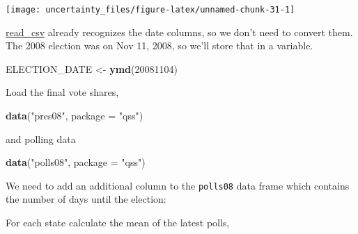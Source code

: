 \documentclass[]{book}
\newenvironment{Shaded}{\begin{snugshade}}{\end{snugshade}}
\newcommand{\KeywordTok}[1]{\textcolor[rgb]{0.13,0.29,0.53}{\textbf{#1}}}
\newcommand{\DataTypeTok}[1]{\textcolor[rgb]{0.13,0.29,0.53}{#1}}
\newcommand{\DecValTok}[1]{\textcolor[rgb]{0.00,0.00,0.81}{#1}}
\newcommand{\StringTok}[1]{\textcolor[rgb]{0.31,0.60,0.02}{#1}}
\newcommand{\OperatorTok}[1]{\textcolor[rgb]{0.81,0.36,0.00}{\textbf{#1}}}
\newcommand{\NormalTok}[1]{#1}
\theoremstyle{definition}
\theoremstyle{definition}
\theoremstyle{definition}
\theoremstyle{remark}
\begin{document}
\begin{center}\texttt{[image: uncertainty\_files/figure-latex/unnamed-chunk-31-1]} \end{center}

\href{https://www.rdocumentation.org/packages/readr/topics/read_csv}{read\_csv}
already recognizes the date columns, so we don't need to convert them.
The 2008 election was on Nov 11, 2008, so we'll store that in a
variable.

\begin{Shaded}
\begin{Highlighting}[]
\NormalTok{ELECTION_DATE <-}\StringTok{ }\KeywordTok{ymd}\NormalTok{(}\DecValTok{20081104}\NormalTok{)}
\end{Highlighting}
\end{Shaded}

Load the final vote shares,

\begin{Shaded}
\begin{Highlighting}[]
\KeywordTok{data}\NormalTok{(}\StringTok{"pres08"}\NormalTok{, }\DataTypeTok{package =} \StringTok{"qss"}\NormalTok{)}
\end{Highlighting}
\end{Shaded}

and polling data

\begin{Shaded}
\begin{Highlighting}[]
\KeywordTok{data}\NormalTok{(}\StringTok{"polls08"}\NormalTok{, }\DataTypeTok{package =} \StringTok{"qss"}\NormalTok{)}
\end{Highlighting}
\end{Shaded}

We need to add an additional column to the \texttt{polls08} data frame
which contains the number of days until the election:

\begin{Shaded}
\end{Shaded}

For each state calculate the mean of the latest polls,
\end{document}
